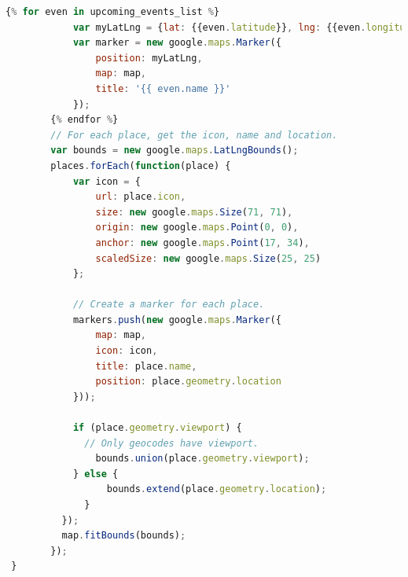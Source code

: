 \documentclass[letterpaper,10pt,onecolumn]{IEEEtran} %
\begin{document}
\begin{enumerate}
\begin{center}
\begin{lstlisting}[language=JavaScript]
        {% for even in upcoming_events_list %}
            var myLatLng = {lat: {{even.latitude}}, lng: {{even.longitude}}};
            var marker = new google.maps.Marker({
                position: myLatLng,
                map: map,
                title: '{{ even.name }}'
            });
        {% endfor %}
        // For each place, get the icon, name and location.
        var bounds = new google.maps.LatLngBounds();
        places.forEach(function(place) {
            var icon = {
                url: place.icon,
                size: new google.maps.Size(71, 71),
                origin: new google.maps.Point(0, 0),
                anchor: new google.maps.Point(17, 34),
                scaledSize: new google.maps.Size(25, 25)
            };

            // Create a marker for each place.
            markers.push(new google.maps.Marker({
                map: map,
                icon: icon,
                title: place.name,
                position: place.geometry.location
            }));
            
            if (place.geometry.viewport) {
              // Only geocodes have viewport.
                bounds.union(place.geometry.viewport);
            } else {
                  bounds.extend(place.geometry.location);
              }
          });
          map.fitBounds(bounds);
        });
 }
\end{lstlisting}
\end{center}

\end{enumerate}
\end{document}
